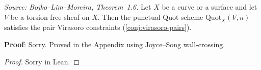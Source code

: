 \begin{theorem}[PunctualQuotSchemeVirasoro]
  \label{thm:quot-virasoro}
  \textit{Source: Bojko--Lim--Moreira, Theorem~1.6.}
  Let \(X\) be a curve or a surface and let \(V\) be a torsion-free sheaf on \(X\).
  Then the punctual Quot scheme \(\mathrm{Quot}_X(V, n)\) satisfies the pair Virasoro
  constraints (\cref{conj:virasoro-pairs}).

  \textbf{Proof}: Sorry. Proved in the Appendix using Joyce--Song wall-crossing.
\end{theorem}

\begin{proof}
  Sorry in Lean.
\end{proof}
